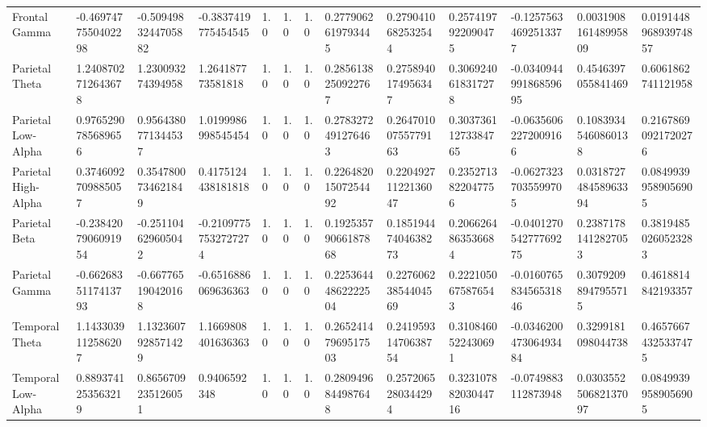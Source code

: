 \begin{longtable}{lllllllllllll}
Frontal Gamma        &   -0.4697477550402298 &   -0.5094983244705882 &    -0.3837419775454545 &      1.0 &              1.0 &                1.0 &   0.2779062619793445 &   0.2790410682532544 &   0.2574197922090475 &    -0.12575634692513377 &    0.003190816148995809 &  0.019144896893974857 \\
Parietal Theta       &    1.2408702712643678 &     1.230093274394958 &      1.264187773581818 &      1.0 &              1.0 &                1.0 &   0.2856138250922767 &   0.2758940174956347 &   0.3069240618317278 &   -0.034094499186859695 &      0.4546397055841469 &    0.6061862741121958 \\
Parietal Low-Alpha   &    0.9765290785689656 &    0.9564380771344537 &     1.0199986998545454 &      1.0 &              1.0 &                1.0 &   0.2783272491276463 &  0.26470100755779163 &  0.30373611273384765 &    -0.06356062272009166 &     0.10839345460860138 &   0.21678690921720276 \\
Parietal High-Alpha  &    0.3746092709885057 &    0.3547800734621849 &     0.4175124438181818 &      1.0 &              1.0 &                1.0 &  0.22648201507254492 &  0.22049271122136047 &   0.2352713822047756 &    -0.06273237035599705 &    0.031872748458963394 &   0.08499399589056905 \\
Parietal Beta        &   -0.2384207906091954 &    -0.251104629605042 &   -0.21097757532727274 &      1.0 &              1.0 &                1.0 &  0.19253579066187868 &  0.18519447404638273 &   0.2066264863536684 &   -0.040127054277769275 &     0.23871781412827053 &   0.38194850260523283 \\
Parietal Gamma       &   -0.6626835117413793 &    -0.667765190420168 &    -0.6516886069636363 &      1.0 &              1.0 &                1.0 &  0.22536444862222504 &  0.22760623854404569 &   0.2221050675876543 &   -0.016076583456531846 &     0.30792098947955715 &    0.4618814842193357 \\
Temporal Theta       &    1.1433039112586207 &    1.1323607928571429 &     1.1669808401636363 &      1.0 &              1.0 &                1.0 &  0.26524147969517503 &  0.24195931470638754 &   0.3108460522430691 &   -0.034620047306493484 &      0.3299181098044738 &   0.46576674325337475 \\
Temporal Low-Alpha   &    0.8893741253563219 &    0.8656709235126051 &           0.9406592348 &      1.0 &              1.0 &                1.0 &   0.2809496844987648 &   0.2572065280344294 &  0.32310788203044716 &     -0.0749883112873948 &    0.030355250682137097 &   0.08499399589056905 \\

\end{longtable}
